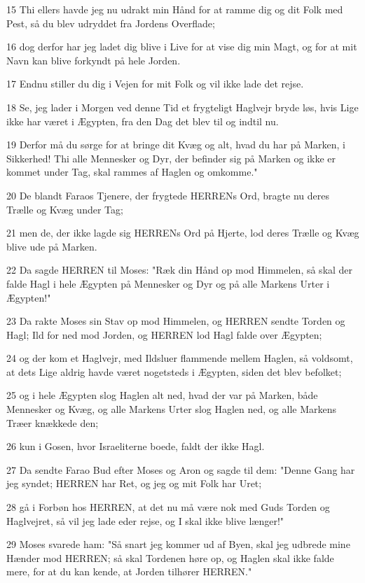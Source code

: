 \par 15 Thi ellers havde jeg nu udrakt min Hånd for at ramme dig og dit Folk med Pest, så du blev udryddet fra Jordens Overflade;
\par 16 dog derfor har jeg ladet dig blive i Live for at vise dig min Magt, og for at mit Navn kan blive forkyndt på hele Jorden.
\par 17 Endnu stiller du dig i Vejen for mit Folk og vil ikke lade det rejse.
\par 18 Se, jeg lader i Morgen ved denne Tid et frygteligt Haglvejr bryde løs, hvis Lige ikke har været i Ægypten, fra den Dag det blev til og indtil nu.
\par 19 Derfor må du sørge for at bringe dit Kvæg og alt, hvad du har på Marken, i Sikkerhed! Thi alle Mennesker og Dyr, der befinder sig på Marken og ikke er kommet under Tag, skal rammes af Haglen og omkomme."
\par 20 De blandt Faraos Tjenere, der frygtede HERRENs Ord, bragte nu deres Trælle og Kvæg under Tag;
\par 21 men de, der ikke lagde sig HERRENs Ord på Hjerte, lod deres Trælle og Kvæg blive ude på Marken.
\par 22 Da sagde HERREN til Moses: "Ræk din Hånd op mod Himmelen, så skal der falde Hagl i hele Ægypten på Mennesker og Dyr og på alle Markens Urter i Ægypten!"
\par 23 Da rakte Moses sin Stav op mod Himmelen, og HERREN sendte Torden og Hagl; Ild for ned mod Jorden, og HERREN lod Hagl falde over Ægypten;
\par 24 og der kom et Haglvejr, med Ildsluer flammende mellem Haglen, så voldsomt, at dets Lige aldrig havde været nogetsteds i Ægypten, siden det blev befolket;
\par 25 og i hele Ægypten slog Haglen alt ned, hvad der var på Marken, både Mennesker og Kvæg, og alle Markens Urter slog Haglen ned, og alle Markens Træer knækkede den;
\par 26 kun i Gosen, hvor Israeliterne boede, faldt der ikke Hagl.
\par 27 Da sendte Farao Bud efter Moses og Aron og sagde til dem: "Denne Gang har jeg syndet; HERREN har Ret, og jeg og mit Folk har Uret;
\par 28 gå i Forbøn hos HERREN, at det nu må være nok med Guds Torden og Haglvejret, så vil jeg lade eder rejse, og I skal ikke blive længer!"
\par 29 Moses svarede ham: "Så snart jeg kommer ud af Byen, skal jeg udbrede mine Hænder mod HERREN; så skal Tordenen høre op, og Haglen skal ikke falde mere, for at du kan kende, at Jorden tilhører HERREN."
